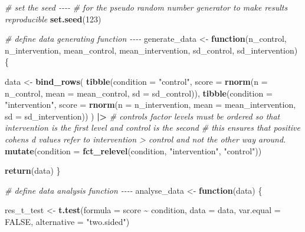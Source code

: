 \documentclass[
]{article}
\newenvironment{Shaded}{\begin{snugshade}}{\end{snugshade}}
\newcommand{\AttributeTok}[1]{\textcolor[rgb]{0.13,0.29,0.53}{#1}}
\newcommand{\CommentTok}[1]{\textcolor[rgb]{0.56,0.35,0.01}{\textit{#1}}}
\newcommand{\ConstantTok}[1]{\textcolor[rgb]{0.56,0.35,0.01}{#1}}
\newcommand{\ControlFlowTok}[1]{\textcolor[rgb]{0.13,0.29,0.53}{\textbf{#1}}}
\newcommand{\DecValTok}[1]{\textcolor[rgb]{0.00,0.00,0.81}{#1}}
\newcommand{\FunctionTok}[1]{\textcolor[rgb]{0.13,0.29,0.53}{\textbf{#1}}}
\newcommand{\NormalTok}[1]{#1}
\newcommand{\OtherTok}[1]{\textcolor[rgb]{0.56,0.35,0.01}{#1}}
\newcommand{\SpecialCharTok}[1]{\textcolor[rgb]{0.81,0.36,0.00}{\textbf{#1}}}
\newcommand{\StringTok}[1]{\textcolor[rgb]{0.31,0.60,0.02}{#1}}
\begin{document}
\begin{Shaded}
\begin{Highlighting}[]
\CommentTok{\# set the seed {-}{-}{-}{-}}
\CommentTok{\# for the pseudo random number generator to make results reproducible}
\FunctionTok{set.seed}\NormalTok{(}\DecValTok{123}\NormalTok{)}


\CommentTok{\# define data generating function {-}{-}{-}{-}}
\NormalTok{generate\_data }\OtherTok{\textless{}{-}} \ControlFlowTok{function}\NormalTok{(n\_control,}
\NormalTok{                          n\_intervention,}
\NormalTok{                          mean\_control,}
\NormalTok{                          mean\_intervention,}
\NormalTok{                          sd\_control,}
\NormalTok{                          sd\_intervention) \{}
  
\NormalTok{  data }\OtherTok{\textless{}{-}} 
    \FunctionTok{bind\_rows}\NormalTok{(}
      \FunctionTok{tibble}\NormalTok{(}\AttributeTok{condition =} \StringTok{"control"}\NormalTok{,}
             \AttributeTok{score =} \FunctionTok{rnorm}\NormalTok{(}\AttributeTok{n =}\NormalTok{ n\_control, }\AttributeTok{mean =}\NormalTok{ mean\_control, }\AttributeTok{sd =}\NormalTok{ sd\_control)),}
      \FunctionTok{tibble}\NormalTok{(}\AttributeTok{condition =} \StringTok{"intervention"}\NormalTok{,}
             \AttributeTok{score =} \FunctionTok{rnorm}\NormalTok{(}\AttributeTok{n =}\NormalTok{ n\_intervention, }\AttributeTok{mean =}\NormalTok{ mean\_intervention, }\AttributeTok{sd =}\NormalTok{ sd\_intervention))}
\NormalTok{    ) }\SpecialCharTok{|\textgreater{}}
    \CommentTok{\# control\textquotesingle{}s factor levels must be ordered so that intervention is the first level and control is the second}
    \CommentTok{\# this ensures that positive cohen\textquotesingle{}s d values refer to intervention \textgreater{} control and not the other way around.}
    \FunctionTok{mutate}\NormalTok{(}\AttributeTok{condition =} \FunctionTok{fct\_relevel}\NormalTok{(condition, }\StringTok{"intervention"}\NormalTok{, }\StringTok{"control"}\NormalTok{))}
  
  \FunctionTok{return}\NormalTok{(data)}
\NormalTok{\}}


\CommentTok{\# define data analysis function {-}{-}{-}{-}}
\NormalTok{analyse\_data }\OtherTok{\textless{}{-}} \ControlFlowTok{function}\NormalTok{(data) \{}

\NormalTok{  res\_t\_test }\OtherTok{\textless{}{-}} \FunctionTok{t.test}\NormalTok{(}\AttributeTok{formula =}\NormalTok{ score }\SpecialCharTok{\textasciitilde{}}\NormalTok{ condition, }
                       \AttributeTok{data =}\NormalTok{ data,}
                       \AttributeTok{var.equal =} \ConstantTok{FALSE}\NormalTok{,}
                       \AttributeTok{alternative =} \StringTok{"two.sided"}\NormalTok{)}
  

\end{Highlighting}
\end{Shaded}
\end{document}
